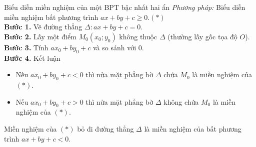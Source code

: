 \begin{dang}{Biểu diễn miền nghiệm của một BPT bậc nhất hai ẩn}
		{\it Phương pháp:} Biểu diễn miền nghiệm bất phương trình $ax+by+c\geq 0$.\quad $(*)$\\
	\textbf{Bước 1.} Vẽ đường thẳng $\Delta\colon ax+by+c=0$.\\
	\textbf{Bước 2.} Lấy một điểm $M_0\left(x_0;y_0\right)$ không thuộc $\Delta$ (thường lấy gốc tọa độ $O$).\\
	\textbf{Bước 3.} Tính $ax_0+by_0+c$ và so sánh với $0$.\\
		\textbf{Bước 4.} Kết luận
		\begin{itemize}
			\item Nếu $ax_0+by_0+c<0$ thì nửa mặt phẳng bờ $\Delta$ chứa $M_0$ là miền nghiệm của $(*)$.
			\item Nếu $ax_0+by_0+c>0$ thì nửa mặt phẳng bờ $\Delta$ không chứa $M_0$ là miền nghiệm của $(*)$.
		\end{itemize}
	\begin{note}
		Miền nghiệm của $(*)$ bỏ đi đường thẳng $\Delta$ là miền nghiệm của bất phương trình $ax+by+c<0$.
	\end{note}
\end{dang}
